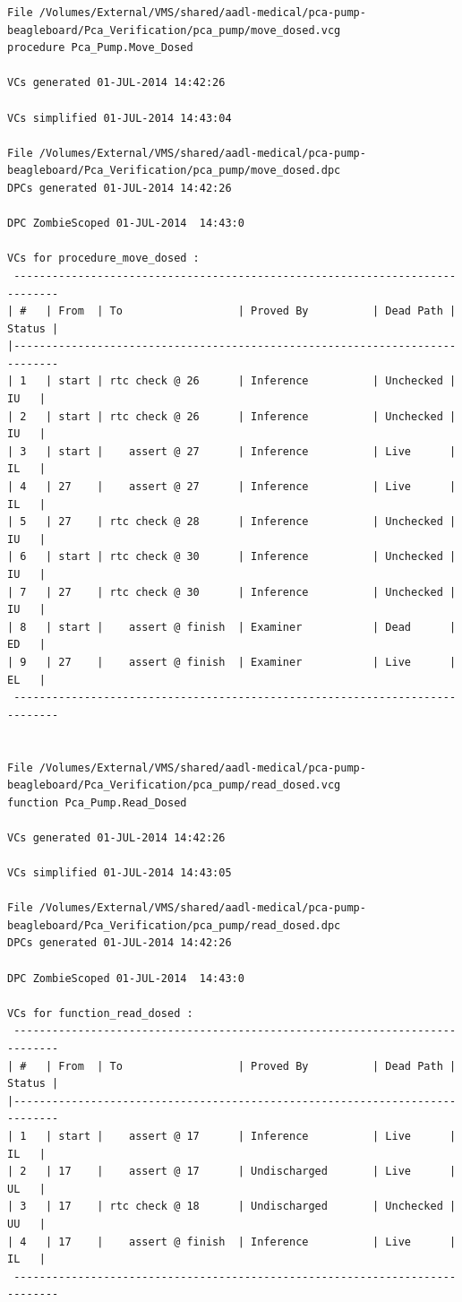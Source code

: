 \begin{lstlisting}[frame=single, gobble=0, caption={POGS report}]
File /Volumes/External/VMS/shared/aadl-medical/pca-pump-beagleboard/Pca_Verification/pca_pump/move_dosed.vcg
procedure Pca_Pump.Move_Dosed

VCs generated 01-JUL-2014 14:42:26

VCs simplified 01-JUL-2014 14:43:04

File /Volumes/External/VMS/shared/aadl-medical/pca-pump-beagleboard/Pca_Verification/pca_pump/move_dosed.dpc
DPCs generated 01-JUL-2014 14:42:26

DPC ZombieScoped 01-JUL-2014  14:43:0

VCs for procedure_move_dosed :
 -----------------------------------------------------------------------------
| #   | From  | To                  | Proved By          | Dead Path | Status |
|-----------------------------------------------------------------------------
| 1   | start | rtc check @ 26      | Inference          | Unchecked |   IU   |
| 2   | start | rtc check @ 26      | Inference          | Unchecked |   IU   |
| 3   | start |    assert @ 27      | Inference          | Live      |   IL   |
| 4   | 27    |    assert @ 27      | Inference          | Live      |   IL   |
| 5   | 27    | rtc check @ 28      | Inference          | Unchecked |   IU   |
| 6   | start | rtc check @ 30      | Inference          | Unchecked |   IU   |
| 7   | 27    | rtc check @ 30      | Inference          | Unchecked |   IU   |
| 8   | start |    assert @ finish  | Examiner           | Dead      |   ED   |
| 9   | 27    |    assert @ finish  | Examiner           | Live      |   EL   |
 -----------------------------------------------------------------------------


File /Volumes/External/VMS/shared/aadl-medical/pca-pump-beagleboard/Pca_Verification/pca_pump/read_dosed.vcg
function Pca_Pump.Read_Dosed

VCs generated 01-JUL-2014 14:42:26

VCs simplified 01-JUL-2014 14:43:05

File /Volumes/External/VMS/shared/aadl-medical/pca-pump-beagleboard/Pca_Verification/pca_pump/read_dosed.dpc
DPCs generated 01-JUL-2014 14:42:26

DPC ZombieScoped 01-JUL-2014  14:43:0

VCs for function_read_dosed :
 -----------------------------------------------------------------------------
| #   | From  | To                  | Proved By          | Dead Path | Status |
|-----------------------------------------------------------------------------
| 1   | start |    assert @ 17      | Inference          | Live      |   IL   |
| 2   | 17    |    assert @ 17      | Undischarged       | Live      |   UL   |
| 3   | 17    | rtc check @ 18      | Undischarged       | Unchecked |   UU   |
| 4   | 17    |    assert @ finish  | Inference          | Live      |   IL   |
 -----------------------------------------------------------------------------



\end{lstlisting}

